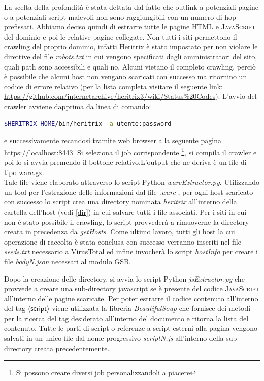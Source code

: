 \documentclass[a4paper, 11pt, oneside]{report}
\begin{document}
La scelta della profondità è stata dettata dal fatto che outlink a potenziali pagine  o a potenziali script malevoli non sono raggiungibili con un numero di hop prefissati. Abbiamo deciso quindi di estrarre tutte le pagine \textsc{HTML} e \textsc{JavaScript} del dominio e poi le relative pagine collegate. Non tutti i siti permettono il crawling del proprio dominio, infatti Heritrix è stato impostato per non violare le direttive del file \textit{robots.txt} in cui vengono specificati dagli amministratori del sito, quali path sono accessibili e quali no. Alcuni vietano il completo crawling, perciò è possibile che alcuni host non vengano scaricati con successo ma ritornino un codice di errore relativo (per la lista completa visitare il seguente link: \url{https://github.com/internetarchive/heritrix3/wiki/Status%20Codes}). 
L'avvio del crawler avviene dapprima da linea di comando: 
\begin{lstlisting}[language=Bash]
$HERITRIX_HOME/bin/heritrix -a utente:password
\end{lstlisting}
e successivamente recandosi tramite web browser alla seguente pagina \\ \textsf{https://localhost:8443}. Si seleziona il job corrispondente \footnote{Si possono creare diversi job personalizzandoli a piacere}, si compila il crawler e poi lo si avvia premendo il bottone relativo.L'output che ne deriva è un file di tipo warc.gz.  \\

Tale file viene elaborato attraverso lo script Python \textit{warcExtractor.py}. Utilizzando un tool per l'estrazione delle informazioni dal file \textit{.warc} \cite{warc} , per ogni host scaricato con successo lo script crea una directory nominata \textit{heritrix} all'interno della cartella dell'host (vedi \ref{dir}) in cui salvare tutti i file associati. Per i siti in cui non è stato possibile il crawling, lo script provvederà a rimuoverne la directory creata in precedenza da \textit{getHosts}. Come ultimo lavoro, tutti gli host la cui operazione di raccolta è stata conclusa con successo verranno inseriti nel file \textit{seeds.txt} necessario a VirusTotal ed infine invocherà lo script \textit{hostInfo} per creare i file \textit{bodyN.json} necessari al modulo GSB.

Dopo la creazione delle directory, si avvia lo script Python \textit{jsExtractor.py} che provvede a creare una sub-directory \textsf{javascript} se è presente del codice \textsc{JavaScript} all'interno delle pagine scaricate.
Per poter estrarre il codice contenuto all'interno del tag $\langle\textsf{script}\rangle $ viene utilizzata la libreria \textit{BeautifulSoup} che fornisce dei metodi per la ricerca del tag desiderato all'interno del documento e ritorna la lista del contenuto. Tutte le parti di script o referenze a script esterni alla pagina vengono salvati in un unico file dal nome progressivo \textit{scriptN.js} all'interno della sub-directory creata precedentemente.\\
\end{document}
